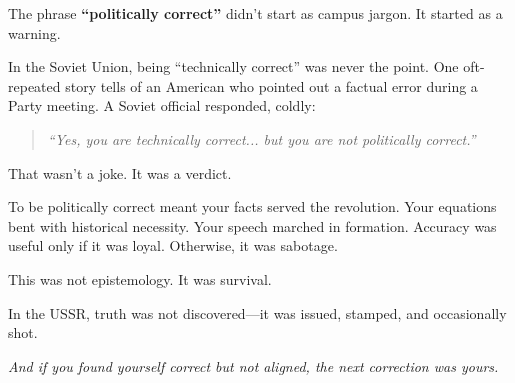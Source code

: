 \begin{tcolorbox}[title=Sidebar: “Politically Correct” — Where Truth Gets Redacted, colback=black!5!white, colframe=black, fonttitle=\bfseries, coltitle=black]

    The phrase \textbf{“politically correct”} didn’t start as campus jargon. It started as a warning.
    
    In the Soviet Union, being “technically correct” was never the point. One oft-repeated story tells of an American who pointed out a factual error during a Party meeting. A Soviet official responded, coldly:
    \begin{quote}
    \textit{“Yes, you are technically correct... but you are not politically correct.”}
    \end{quote}
    
    That wasn’t a joke. It was a verdict.
    
    To be politically correct meant your facts served the revolution. Your equations bent with historical necessity. Your speech marched in formation. Accuracy was useful only if it was loyal. Otherwise, it was sabotage.
    
    This was not epistemology. It was survival.
    
    In the USSR, truth was not discovered—it was issued, stamped, and occasionally shot.
    
    \textit{And if you found yourself correct but not aligned, the next correction was yours.}
    
\end{tcolorbox}


